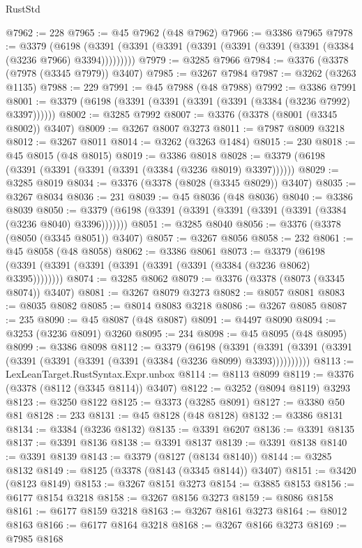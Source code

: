 \begin{lexlean}{RustStd}
\begin{coremodule}
{\begin{coremodule}
{{{{{{{{{{{{{{{{{{{{{{{{{{{{{{{{{{{{{{{@7962 := 228
@7965 := @45 @7962 (@48 @7962)
@7966 := @3386 @7965
@7978 := @3379
    (@6198 (@3391 (@3391 (@3391 (@3391 (@3391 (@3391 (@3391 (@3384 (@3236 @7966) @3394)))))))))
@7979 := @3285 @7966
@7984 := @3376 (@3378 (@7978 (@3345 @7979)) @3407)
@7985 := @3267 @7984
@7987 := @3262 (@3263 @1135)
@7988 := 229
@7991 := @45 @7988 (@48 @7988)
@7992 := @3386 @7991
@8001 := @3379 (@6198 (@3391 (@3391 (@3391 (@3391 (@3384 (@3236 @7992) @3397))))))
@8002 := @3285 @7992
@8007 := @3376 (@3378 (@8001 (@3345 @8002)) @3407)
@8009 := @3267 @8007 @3273
@8011 := @7987 @8009 @3218
@8012 := @3267 @8011
@8014 := @3262 (@3263 @1484)
@8015 := 230
@8018 := @45 @8015 (@48 @8015)
@8019 := @3386 @8018
@8028 := @3379 (@6198 (@3391 (@3391 (@3391 (@3391 (@3384 (@3236 @8019) @3397))))))
@8029 := @3285 @8019
@8034 := @3376 (@3378 (@8028 (@3345 @8029)) @3407)
@8035 := @3267 @8034
@8036 := 231
@8039 := @45 @8036 (@48 @8036)
@8040 := @3386 @8039
@8050 := @3379 (@6198 (@3391 (@3391 (@3391 (@3391 (@3391 (@3384 (@3236 @8040) @3396)))))))
@8051 := @3285 @8040
@8056 := @3376 (@3378 (@8050 (@3345 @8051)) @3407)
@8057 := @3267 @8056
@8058 := 232
@8061 := @45 @8058 (@48 @8058)
@8062 := @3386 @8061
@8073 := @3379 (@6198 (@3391 (@3391 (@3391 (@3391 (@3391 (@3391 (@3384 (@3236 @8062) @3395))))))))
@8074 := @3285 @8062
@8079 := @3376 (@3378 (@8073 (@3345 @8074)) @3407)
@8081 := @3267 @8079 @3273
@8082 := @8057 @8081
@8083 := @8035 @8082
@8085 := @8014 @8083 @3218
@8086 := @3267 @8085
@8087 := 235
@8090 := @45 @8087 (@48 @8087)
@8091 := @4497 @8090
@8094 := @3253 (@3236 @8091) @3260
@8095 := 234
@8098 := @45 @8095 (@48 @8095)
@8099 := @3386 @8098
@8112 := @3379
    (@6198
      (@3391 (@3391 (@3391 (@3391 (@3391 (@3391 (@3391 (@3391 (@3384 (@3236 @8099) @3393))))))))))
@8113 := LexLeanTarget.RustSyntax.Expr.unbox
@8114 := @8113 @8099
@8119 := @3376 (@3378 (@8112 (@3345 @8114)) @3407)
@8122 := @3252 (@8094 @8119) @3293
@8123 := @3250 @8122
@8125 := @3373 (@3285 @8091)
@8127 := @3380 @50 @81
@8128 := 233
@8131 := @45 @8128 (@48 @8128)
@8132 := @3386 @8131
@8134 := @3384 (@3236 @8132)
@8135 := @3391 @6207
@8136 := @3391 @8135
@8137 := @3391 @8136
@8138 := @3391 @8137
@8139 := @3391 @8138
@8140 := @3391 @8139
@8143 := @3379 (@8127 (@8134 @8140))
@8144 := @3285 @8132
@8149 := @8125 (@3378 (@8143 (@3345 @8144)) @3407)
@8151 := @3420 (@8123 @8149)
@8153 := @3267 @8151 @3273
@8154 := @3885 @8153
@8156 := @6177 @8154 @3218
@8158 := @3267 @8156 @3273
@8159 := @8086 @8158
@8161 := @6177 @8159 @3218
@8163 := @3267 @8161 @3273
@8164 := @8012 @8163
@8166 := @6177 @8164 @3218
@8168 := @3267 @8166 @3273
@8169 := @7985 @8168
}}}}}}}}}}}}}}}}}}}}}}}}}}}}}}}}}}}}}}}
\end{coremodule}}
\end{coremodule}
\end{lexlean}
